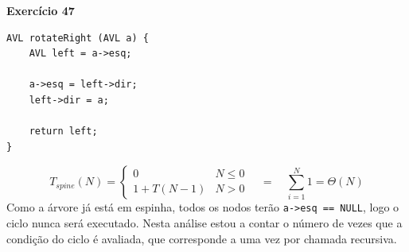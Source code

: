 \documentclass[a4paper,11pt]{article}
\begin{document}
\noindent \textbf{Exercício 47}

\begin{verbatim}
AVL rotateRight (AVL a) {
	AVL left = a->esq;
	
	a->esq = left->dir;
	left->dir = a;
	
	return left;
}
\end{verbatim}
\[
	T_{spine}(N) =
	\begin{cases}
		0 & N \leq 0 \\
		1 + T(N - 1) & N > 0
	\end{cases}
	\quad = \quad \sum_{i=1}^{N} 1 = \Theta(N)
\]
Como a árvore já está em espinha, todos os nodos terão \texttt{a->esq == NULL}, logo o ciclo nunca será executado. Nesta análise estou a contar o número de vezes que a condição do ciclo é avaliada, que corresponde a uma vez por chamada recursiva.
\end{document}
